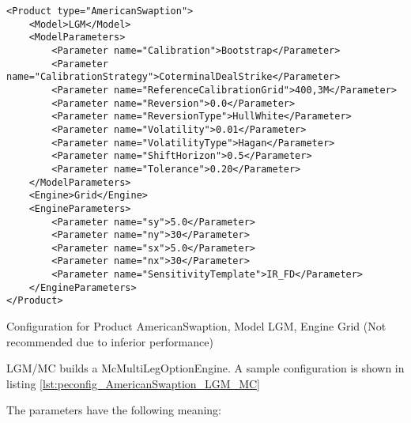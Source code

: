 \begin{longlisting}
\begin{verbatim}
<Product type="AmericanSwaption">
    <Model>LGM</Model>
    <ModelParameters>
        <Parameter name="Calibration">Bootstrap</Parameter>
        <Parameter name="CalibrationStrategy">CoterminalDealStrike</Parameter>
        <Parameter name="ReferenceCalibrationGrid">400,3M</Parameter>
        <Parameter name="Reversion">0.0</Parameter>
        <Parameter name="ReversionType">HullWhite</Parameter>
        <Parameter name="Volatility">0.01</Parameter>
        <Parameter name="VolatilityType">Hagan</Parameter>
        <Parameter name="ShiftHorizon">0.5</Parameter>
        <Parameter name="Tolerance">0.20</Parameter>
    </ModelParameters>
    <Engine>Grid</Engine>
    <EngineParameters>
        <Parameter name="sy">5.0</Parameter>
        <Parameter name="ny">30</Parameter>
        <Parameter name="sx">5.0</Parameter>
        <Parameter name="nx">30</Parameter>
        <Parameter name="SensitivityTemplate">IR_FD</Parameter>
    </EngineParameters>
</Product>
\end{verbatim}
\caption{Configuration for Product AmericanSwaption, Model LGM, Engine Grid (Not recommended due to inferior performance)}
\label{lst:peconfig_AmericanSwaption_LGM_Grid}
\end{longlisting}

LGM/MC builds a McMultiLegOptionEngine. A sample configuration is shown in
listing \ref{lst:peconfig_AmericanSwaption_LGM_MC}

The parameters have the following meaning:


